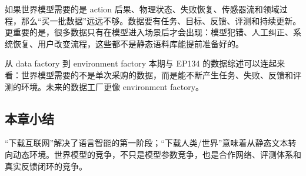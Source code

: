 如果世界模型需要的是 action 后果、物理状态、失败恢复、传感器流和领域过程，那么“买一批数据”远远不够。数据要有任务、目标、反馈、评测和持续更新。更重要的是，很多数据只有在模型进入场景后才会出现：模型犯错、人工纠正、系统恢复、用户改变流程，这些都不是静态语料库能提前准备好的。

\begin{knowledgebox}{从 data factory 到 environment factory}
本期与 EP134 的数据综述可以连起来看：世界模型需要的不是单次采购的数据，而是能不断产生任务、失败、反馈和评测的环境。未来的数据工厂更像 environment factory。
\end{knowledgebox}

\subsection{本章小结}

“下载互联网”解决了语言智能的第一阶段；“下载人类/世界”意味着从静态文本转向动态环境。世界模型的竞争，不只是模型参数竞争，也是合作网络、评测体系和真实反馈闭环的竞争。


